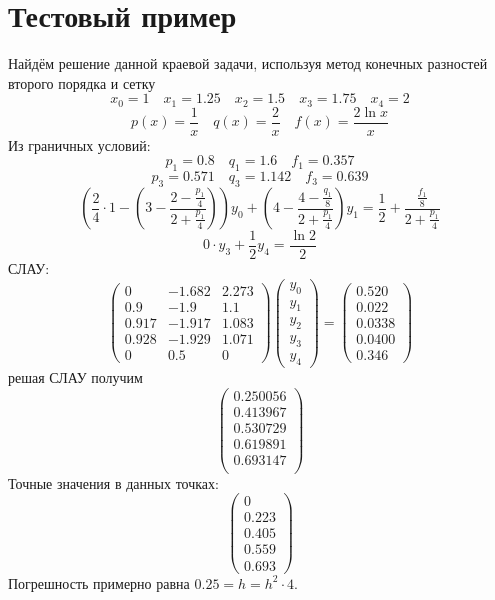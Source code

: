 \documentclass[a4paper]{article}
\begin{document}
\section{Тестовый пример}\label{sec:S5}
Найдём решение данной краевой задачи, используя метод конечных разностей второго порядка и сетку \[
  x_{0} = 1 \quad x_{1} = 1.25 \quad x_{2} = 1.5 \quad x_{3} = 1.75 \quad x_{4} = 2
\]\[
  p(x) = \frac{1}{x} \quad q(x) = \frac{2}{x} \quad f(x) = \frac{2\ln x}{x}
\]
Из граничных условий:
\[
  p_1 = 0.8 \quad q_1 = 1.6 \quad f_1 = 0.357
\]\[
  p_3 = 0.571 \quad q_3 = 1.142 \quad f_3 = 0.639
\]\[
  (\frac{2}{4}\cdot 1 - \left( 3 - \frac{2-\frac{p_{1}}{4}}{2+\frac{p_1}{4}} \right))y_{0} + \left( 4 - \frac{4-\frac{q_1}{8}}{2+\frac{p_1}{4}} \right)y_{1} = \frac{1}{2} + \frac{\frac{f_1}{8}}{2+\frac{p_1}{4}}
\]\[
  0 \cdot y_{3} + \frac{1}{2} y_{4} = \frac{\ln 2}{2}
\]
СЛАУ: \[
  \begin{pmatrix}
    0 & -1.682 & 2.273  \\
    0.9 & -1.9 & 1.1 \\
    0.917 & -1.917 & 1.083  \\
    0.928 & -1.929 & 1.071  \\
    0 & 0.5 & 0
  \end{pmatrix}
  \begin{pmatrix}
    y_{0} \\ y_{1} \\ y_{2} \\ y_{3} \\ y_{4}
  \end{pmatrix} =
  \begin{pmatrix}
    0.520 \\0.022\\0.0338\\0.0400\\0.346
  \end{pmatrix}
\]
решая СЛАУ получим \[
  \begin{pmatrix}
    0.250056\\
    0.413967\\
    0.530729\\
    0.619891\\
    0.693147\\
  \end{pmatrix}
\]
Точные значения в данных точках: \[
  \begin{pmatrix}
    0 \\ 0.223 \\ 0.405 \\ 0.559 \\ 0.693
  \end{pmatrix}
\]
Погрешность примерно равна \(0.25 = h = h^{2}\cdot4\).
\end{document}
